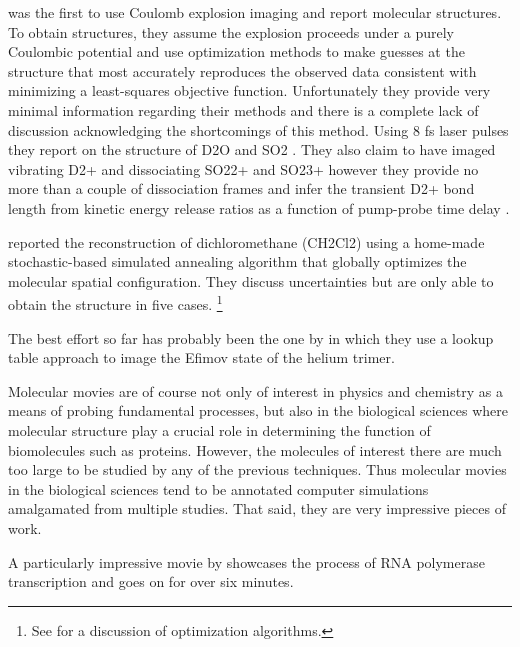 \citet{Legare05structure,Legare05dynamics} was the first to use Coulomb explosion imaging and report molecular structures. To obtain structures, they assume the explosion proceeds under a purely Coulombic potential and use optimization methods to make guesses at the structure that most accurately reproduces the observed data consistent with minimizing a least-squares objective function. Unfortunately they provide very minimal information regarding their methods and there is a complete lack of discussion acknowledging the shortcomings of this method. Using 8 fs laser pulses they report on the structure of D2O and SO2 \citep{Legare05structure}. They also claim to have imaged vibrating D2+ and dissociating SO22+ and SO23+ however they provide no more than a couple of dissociation frames and infer the transient D2+ bond length from kinetic energy release ratios as a function of pump-probe time delay \citep{Legare05dynamics}.

\citet{Gagnon08} reported the reconstruction of dichloromethane (CH2Cl2) using a home-made  stochastic-based simulated annealing algorithm that globally optimizes the molecular spatial configuration. They discuss uncertainties but are only able to obtain the structure in five cases. \footnote{See \citet{Bocharova11} for a discussion of optimization algorithms.}

The best effort so far has probably been the one by \citet{Kunitski15} in which they use a lookup table approach to image the Efimov state of the helium trimer.

Molecular movies are of course not only of interest in physics and chemistry as a means of probing fundamental processes, but also in the biological sciences where molecular structure play a crucial role in determining the function of biomolecules such as proteins. However, the molecules of interest there are much too large to be studied by any of the previous techniques. Thus molecular movies in the biological sciences tend to be annotated computer simulations amalgamated from multiple studies. That said, they are very impressive pieces of work.

A particularly impressive movie by \citet{Cheung12} showcases the process of RNA polymerase transcription and goes on for over six minutes.

